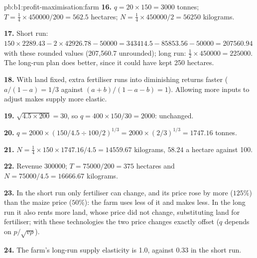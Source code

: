 \begin{solution}{pb:b1:profit-maximisation:farm}
\textbf{16.} $q = 20 \times 150 = 3000$ tonnes; $T = \tfrac14 \times 450000/200 = 562.5$
hectares; $N = \tfrac14 \times 450000/2 = 56250$ kilograms.

\textbf{17.} Short run: $150 \times 2289.43 - 2 \times 42926.78 - 50000 = 343414.5 - 85853.56 - 50000
= 207560.94$ with these rounded values (207,560.7 unrounded); long run: $\tfrac12 \times 450000 = 225000$. The long-run plan
does better, since it could have kept 250 hectares.

\textbf{18.} With land fixed, extra fertiliser runs into diminishing returns
faster ($a/(1 - a) = 1/3$ against $(a + b)/(1 - a - b) = 1$). Allowing more inputs
to adjust makes supply more elastic.

\textbf{19.} $\sqrt{4.5 \times 200} = 30$, so $q = 400 \times 150/30 = 2000$: unchanged.

\textbf{20.} $q = 2000 \times (150/4.5 \div 100/2)^{1/3} = 2000 \times (2/3)^{1/3} = 1747.16$ tonnes.

\textbf{21.} $N = \tfrac14 \times 150 \times 1747.16/4.5 = 14559.67$ kilograms, $58.24$ a hectare
against 100.

\textbf{22.} Revenue $300000$; $T = 75000/200 = 375$ hectares and
$N = 75000/4.5 = 16666.67$ kilograms.

\textbf{23.} In the short run only fertiliser can change, and its price rose
by more ($125\%$) than the maize price ($50\%$): the farm uses less of it and
makes less. In the long run it also rents more land, whose price did not
change, substituting land for fertiliser; with these technologies the two
price changes exactly offset ($q$ depends on $p/\sqrt{v\rho}$).

\textbf{24.} The farm's long-run supply elasticity is 1.0, against 0.33 in the
short run.
\end{solution}
